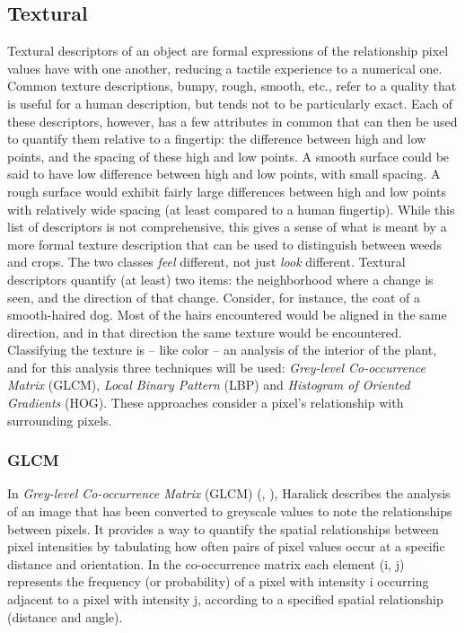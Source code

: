 \documentclass[letterpaper, notitlepage]{report}
\begin{document}
\subsection{Textural}
Textural descriptors of an object are formal expressions of the relationship pixel values have with one another, reducing a tactile experience to a numerical one. Common texture descriptions, bumpy, rough, smooth, etc., refer to a quality that is useful for a human description, but tends not to be particularly exact. Each of these descriptors, however, has a few attributes in common that can then be used to quantify them relative to a fingertip: the difference between high and low points, and the spacing of these high and low points. A smooth surface could be said to have low difference between high and low points, with small spacing. A rough surface would exhibit fairly large differences between high and low points with relatively wide spacing (at least compared to a human fingertip). While this list of descriptors is not comprehensive,  this gives a sense of what is meant by a more formal texture description that can be used to distinguish between weeds and crops. The two classes \textit{feel} different, not just \textit{look} different. Textural descriptors quantify (at least) two items: the neighborhood where a change is seen, and the direction of that change. Consider, for instance, the coat of a smooth-haired dog. Most of the hairs encountered would be aligned in the same direction, and in that direction the same texture would be encountered.
Classifying the texture is -- like color -- an analysis of the interior of the plant, and for this analysis three techniques will be used:  \textit{Grey-level Co-occurrence Matrix} (GLCM), \textit{Local Binary Pattern} (LBP) and \textit{Histogram of Oriented Gradients} (HOG). These approaches consider a pixel's relationship with surrounding pixels. 

\subsubsection{GLCM}
In \textit{Grey-level Co-occurrence Matrix} (GLCM) (\cite{Haralick1973-gr}, \cite{Hall-Beyer2017-nx}), Haralick describes the analysis of an image that has been converted to greyscale values to note the relationships between pixels. It provides a way to quantify the spatial relationships between pixel intensities by tabulating how often pairs of pixel values occur at a specific distance and orientation. In the co-occurrence matrix each element (i, j) represents the frequency (or probability) of a pixel with intensity i occurring adjacent to a pixel with intensity j, according to a specified spatial relationship (distance and angle).
\end{document}
